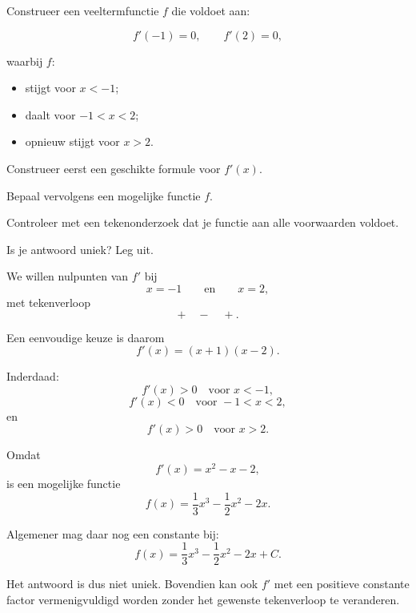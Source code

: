 \documentclass{ximera}
\begin{document}





\begin{oefening}{\oefG}

Construeer een veeltermfunctie $f$ die voldoet aan:

\[
f'(-1)=0,
\qquad
f'(2)=0,
\]

waarbij $f$:

\begin{itemize}
  \item stijgt voor $x<-1$;
  \item daalt voor $-1<x<2$;
  \item opnieuw stijgt voor $x>2$.
\end{itemize}

\begin{question}
Construeer eerst een geschikte formule voor $f'(x)$.
\end{question}

\begin{question}
Bepaal vervolgens een mogelijke functie $f$.
\end{question}

\begin{question}
Controleer met een tekenonderzoek dat je functie aan alle
voorwaarden voldoet.
\end{question}

\begin{question}
Is je antwoord uniek? Leg uit.
\end{question}

\begin{oplossing}

We willen nulpunten van $f'$ bij
\[
x=-1
\qquad\text{en}\qquad
x=2,
\]
met tekenverloop
\[
+\quad -\quad +.
\]

Een eenvoudige keuze is daarom
\[
\boxed{f'(x)=(x+1)(x-2)}.
\]

Inderdaad:
\[
f'(x)>0 \quad \text{voor }x<-1,
\]
\[
f'(x)<0 \quad \text{voor }-1<x<2,
\]
en
\[
f'(x)>0 \quad \text{voor }x>2.
\]

Omdat
\[
f'(x)=x^2-x-2,
\]
is een mogelijke functie
\[
\boxed{
f(x)=\frac13x^3-\frac12x^2-2x
}.
\]

Algemener mag daar nog een constante bij:
\[
f(x)=\frac13x^3-\frac12x^2-2x+C.
\]

Het antwoord is dus niet uniek. Bovendien kan ook $f'$ met een positieve
constante factor vermenigvuldigd worden zonder het gewenste tekenverloop te
veranderen.

\end{oplossing}

\end{oefening}
\end{document}
